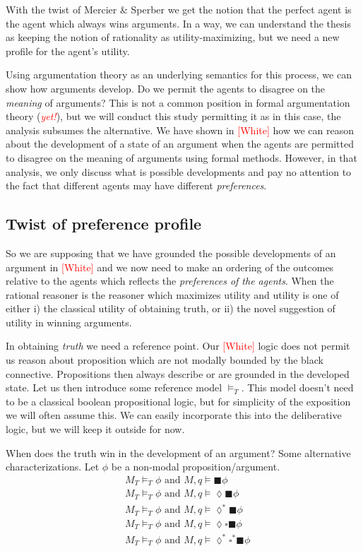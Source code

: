 \documentclass{article}
\newcommand{\todo}[1]{\textcolor{red}{#1}}
\newcommand{\bbox}{\blacksquare}
\newcommand{\dbox}{\square}
\newcommand{\ddia}{\lozenge}
\begin{document}
With the twist of Mercier \& Sperber we get the notion that the perfect agent is the agent which always wins arguments. In a way, we can understand the thesis as keeping the notion of rationality as utility-maximizing, but we need a new profile for the agent's utility. 

Using argumentation theory as an underlying semantics for this process, we can show how arguments develop. Do we permit the agents to disagree on the \emph{meaning} of arguments? This is not a common position in formal argumentation theory (\todo{\emph{yet!}}), but we will conduct this study permitting it as in this case, the analysis subsumes the alternative. We have shown in \todo{[White]} how we can reason about the development of a state of an argument when the agents are permitted to disagree on the meaning of arguments using formal methods. However, in that analysis, we only discuss what is possible developments and pay no attention to the fact that different agents may have different \emph{preferences}.

\subsection{Twist of preference profile}
So we are supposing that we have grounded the possible developments of an argument in \todo{[White]} and we now need to make an ordering of the outcomes relative to the agents which reflects the \emph{preferences of the agents}. When the rational reasoner is the reasoner which maximizes utility and utility is one of either i) the classical utility of obtaining truth, or ii) the novel suggestion of utility in winning arguments. 

In obtaining \emph{truth} we need a reference point. Our \todo{[White]} logic does not permit us reason about proposition which are not modally bounded by the black connective. Propositions then always describe or are grounded in the developed state. Let us then introduce some reference model $\models_T$. This model doesn't need to be a classical boolean propositional logic, but for simplicity of the exposition we will often assume this. We can easily incorporate this into the deliberative logic, but we will keep it outside for now. 

When does the truth win in the development of an argument? Some alternative characterizations. Let $\phi$ be a non-modal proposition/argument.
\begin{align}
&M_T \models_T \phi \text{ and } M, q \models \bbox \phi \\
&M_T \models_T \phi \text{ and } M, q \models \ddia \bbox \phi \\
&M_T \models_T \phi \text{ and } M, q \models \ddia^* \bbox \phi \\
&M_T \models_T \phi \text{ and } M, q \models \ddia\dbox \bbox\phi \\
&M_T \models_T \phi \text{ and } M, q \models \ddia^*\dbox^* \bbox \phi 
\end{align}
\end{document}
